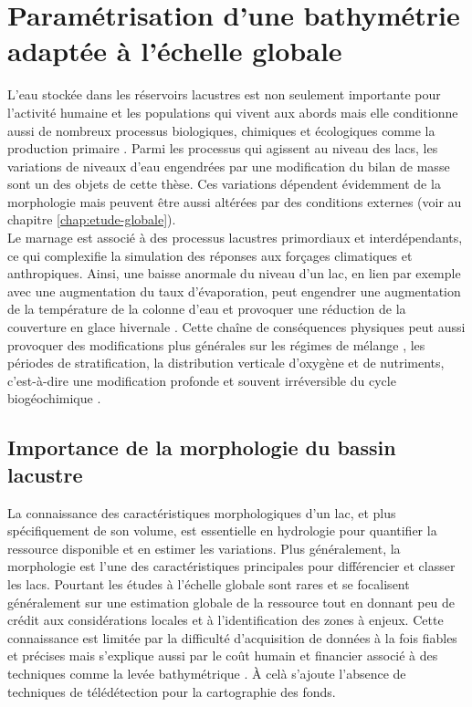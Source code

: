 \chapter{{\selectfont Paramétrisation d'une bathymétrie adaptée à l'échelle globale}}
\label{chap:morpho_lac}
\minitoc

L'eau stockée dans les réservoirs lacustres est non seulement importante pour l'activité humaine et les populations qui vivent aux abords \citep{marsily2018} mais elle conditionne aussi de nombreux processus biologiques, chimiques et écologiques comme la production primaire \citep{fee1996,blais1995}. Parmi les processus qui agissent au niveau des lacs, les variations de niveaux d'eau engendrées par une modification du bilan de masse sont un des objets de cette thèse. Ces variations dépendent évidemment de la morphologie mais  peuvent être aussi altérées par des conditions externes (voir au chapitre \ref{chap:etude-globale}).\\
Le marnage est associé à des processus lacustres primordiaux et interdépendants, ce qui complexifie la simulation des réponses aux forçages climatiques et anthropiques. Ainsi, une baisse anormale du niveau d'un lac, en lien par exemple avec une augmentation du taux d'évaporation, peut engendrer une augmentation de la température de la colonne d'eau et provoquer une réduction de la couverture en glace hivernale \citep{sharma2019}. Cette chaîne de conséquences physiques peut aussi provoquer des modifications plus générales sur les régimes de mélange \citep{shatwell2019,woolway2019}, les périodes de stratification, la distribution verticale d'oxygène et de nutriments, c'est-à-dire une modification profonde et souvent irréversible du cycle biogéochimique \citep{saros2019}.

\section{{\selectfont Importance de la morphologie du bassin lacustre}}

La connaissance des caractéristiques morphologiques d'un lac, et plus spécifiquement de son volume, est essentielle en hydrologie pour quantifier la ressource disponible et en estimer les variations. Plus généralement, la morphologie est l'une des caractéristiques principales pour différencier et classer les lacs. Pourtant les études à l'échelle globale sont rares \citep{meybeck1995,ryanzhin2005,messager2016,cael2017} et se focalisent généralement sur une estimation globale de la ressource tout en donnant peu de crédit aux considérations locales et à l'identification des zones à enjeux. Cette connaissance est limitée par la difficulté d'acquisition de données à la fois fiables et précises mais s'explique aussi par le coût humain et financier associé à des techniques comme la levée bathymétrique \citep{hollister2010}. À celà s'ajoute l'absence de techniques de télédétection pour la cartographie des fonds.\\

